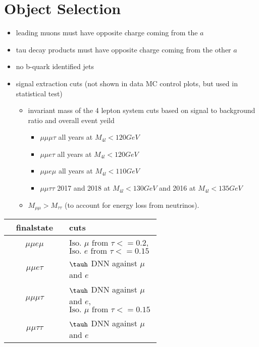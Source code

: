 \section{Object Selection}
\label{sec:objsel}
\begin{itemize}
    \item leading muons must have opposite charge coming from the $a$
    \item tau decay products must have opposite charge coming from the other $a$
    \item no b-quark identified jets 
    \item signal extraction cuts (not shown in data MC control plots, but used in statistical test)
    \begin{itemize}
    \item invariant mass of the 4 lepton system cuts based on signal to background ratio and overall event yeild
    \begin{itemize}
        \item $\mu\mu\mu\tau$ all years at $M_{4l}<120GeV$
        \item $\mu\mu e \tau$ all years at $M_{4l}<120GeV$
        \item $\mu\mu e \mu$ all years at $M_{4l}<110GeV$
        \item $\mu\mu\tau\tau$ 2017 and 2018 at $M_{4l}<130GeV$ and 2016 at $M_{4l}<135GeV$
    \end{itemize}
    \item $M_{\mu\mu} > M_{\tau\tau}$ (to account for energy loss from neutrinos).
    \end{itemize}
\end{itemize}

\begin{table}[h!tbp]
\centering
{}
\begin{tabular*}{0.8\textwidth}{c|p{0.6\linewidth}}
\hline
finalstate          & cuts \\\hline 
$\mu\mu e \mu$    &    $\text{Iso. $\mu$ from $\tau$} <= 0.2$, $\text{Iso. $e$ from $\tau$} <= 0.15$       \\\hline
$\mu\mu e \tau$   &   $\tauh$ DNN against $\mu$ and $e$        \\\hline
$\mu\mu\mu\tau$   &   $\tauh$ DNN against $\mu$ and $e$,$\text{Iso. $\mu$ from $\tau$} <= 0.15$        \\\hline
$\mu\mu\tau\tau$  &   $\tauh$ DNN against $\mu$ and $e$       \\\hline
\end{tabular*}
\end{table}

